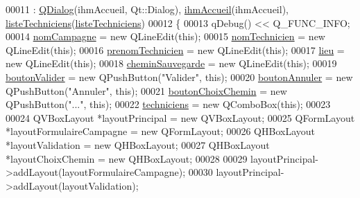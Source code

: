 \begin{DoxyCode}
00011                                                                                                        : 
      \hyperlink{class_q_dialog}{QDialog}(ihmAccueil, Qt::Dialog), \hyperlink{class_i_h_m_creation_campagne_a6b5ea4a52138016a07a37060669288ae}{ihmAccueil}(ihmAccueil), 
      \hyperlink{class_i_h_m_creation_campagne_aee78d20f0263359283cbcbc50fac3143}{listeTechniciens}(\hyperlink{class_i_h_m_creation_campagne_aee78d20f0263359283cbcbc50fac3143}{listeTechniciens})
00012 \{
00013     qDebug() << Q\_FUNC\_INFO;
00014     \hyperlink{class_i_h_m_creation_campagne_a6f07f2571a10f035c7b6a3ef1daefdab}{nomCampagne} = \textcolor{keyword}{new} QLineEdit(\textcolor{keyword}{this});
00015     \hyperlink{class_i_h_m_creation_campagne_a5546fee9a51daceb1b719b105427dfe9}{nomTechnicien} = \textcolor{keyword}{new} QLineEdit(\textcolor{keyword}{this});
00016     \hyperlink{class_i_h_m_creation_campagne_a95e0a4f224110a79731e947baa505b7e}{prenomTechnicien} = \textcolor{keyword}{new} QLineEdit(\textcolor{keyword}{this});
00017     \hyperlink{class_i_h_m_creation_campagne_af68a722acc97a1011ff82752169a2ac8}{lieu} = \textcolor{keyword}{new} QLineEdit(\textcolor{keyword}{this});
00018     \hyperlink{class_i_h_m_creation_campagne_a95c12e2d42063f9c510704b87e3357da}{cheminSauvegarde} = \textcolor{keyword}{new} QLineEdit(\textcolor{keyword}{this});
00019     \hyperlink{class_i_h_m_creation_campagne_a7c1dbc0141ba19b9ac16ea1444cd5d6f}{boutonValider} = \textcolor{keyword}{new} QPushButton(\textcolor{stringliteral}{"Valider"}, \textcolor{keyword}{this});
00020     \hyperlink{class_i_h_m_creation_campagne_ab20ebd5f09b98103c682ed2e1b192a1d}{boutonAnnuler} = \textcolor{keyword}{new} QPushButton(\textcolor{stringliteral}{"Annuler"}, \textcolor{keyword}{this});
00021     \hyperlink{class_i_h_m_creation_campagne_ab709b06a83d8e1ebf9c920e7c60e2d79}{boutonChoixChemin} = \textcolor{keyword}{new} QPushButton(\textcolor{stringliteral}{"..."}, \textcolor{keyword}{this});
00022     \hyperlink{class_i_h_m_creation_campagne_a8235e7a18cda1298be624a59a4cc1a56}{techniciens} = \textcolor{keyword}{new} QComboBox(\textcolor{keyword}{this});
00023 
00024     QVBoxLayout *layoutPrincipal = \textcolor{keyword}{new} QVBoxLayout;
00025     QFormLayout *layoutFormulaireCampagne = \textcolor{keyword}{new} QFormLayout;
00026     QHBoxLayout *layoutValidation = \textcolor{keyword}{new} QHBoxLayout;
00027     QHBoxLayout *layoutChoixChemin = \textcolor{keyword}{new} QHBoxLayout;
00028 
00029     layoutPrincipal->addLayout(layoutFormulaireCampagne);
00030     layoutPrincipal->addLayout(layoutValidation);

\end{DoxyCode}
